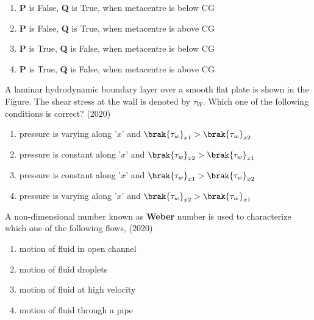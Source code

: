         \begin{enumerate}
            \item \textbf{P} is False, \textbf{Q} is True, when metacentre is below CG
            \item \textbf{P} is False, \textbf{Q} is True, when metacentre is above CG
            \item \textbf{P} is True, \textbf{Q} is False, when metacentre is below CG
            \item \textbf{P} is True, \textbf{Q} is False, when metacentre is above CG
        \end{enumerate}


    
    \item A laminar hydrodynamic boundary layer over a smooth flat plate is shown in the Figure. The shear stress at the wall is denoted by $\tau_W$. Which one of the following conditions is correct?
    \hfill{(2020)} 

    

    \begin{enumerate}
        \item pressure is varying along '$x$' and $\brak{\tau_w}_{x1}>\brak{\tau_w}_{x2}$
        \item pressure is constant along '$x$' and $\brak{\tau_w}_{x2}>\brak{\tau_w}_{x1}$
        \item pressure is constant along '$x$' and $\brak{\tau_w}_{x1}>\brak{\tau_w}_{x2}$
        \item pressure is varying along '$x$' and $\brak{\tau_w}_{x2}>\brak{\tau_w}_{x1}$
    \end{enumerate}



    
    \item A non-dimensional number known as \textbf{Weber} number is used to characterize which one of the following flows,
    \hfill{(2020)}
    
    \begin{multicols}{2}
    \begin{enumerate}
        \item motion of fluid in open channel
        \item motion of fluid droplets
        \item motion of fluid at high velocity
        \item motion of fluid through a pipe
    \end{enumerate}
    \end{multicols}
